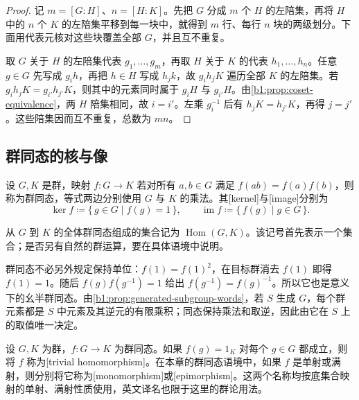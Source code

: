 \begin{proof}
	记 \(m=[G:H]\)、\(n=[H:K]\)。先把 \(G\) 分成 \(m\) 个 \(H\) 的左陪集，再将 \(H\) 中的 \(n\) 个 \(K\) 的左陪集平移到每一块中，就得到 \(m\) 行、每行 \(n\) 块的两级划分。下面用代表元核对这些块覆盖全部 \(G\)，并且互不重复。

	取 \(G\) 关于 \(H\) 的左陪集代表 \(g_1,\ldots,g_m\)，再取 \(H\) 关于 \(K\) 的代表 \(h_1,\ldots,h_n\)。任意 \(g\in G\) 先写成 \(g_i h\)，再把 \(h\in H\) 写成 \(h_jk\)，故 \(g_ih_jK\) 遍历全部 \(K\) 的左陪集。若 \(g_ih_jK=g_{i'}h_{j'}K\)，则其中的元素同时属于 \(g_iH\) 与 \(g_{i'}H\)。由\cref{b1:prop:coset-equivalence}，两 \(H\) 陪集相同，故 \(i=i'\)。左乘 \(g_i^{-1}\) 后有 \(h_jK=h_{j'}K\)，再得 \(j=j'\)。这些陪集因而互不重复，总数为 \(mn\)。
\end{proof}

\subsection{群同态的核与像}
\label{b1:subsec:0202:03}

\begin{definition}\label{b1:def:group-homomorphism}
	设 \(G,K\) 是群，映射 \(f:G\rightarrow K\) 若对所有 \(a,b\in G\) 满足 \(f(ab)=f(a)f(b)\)，则称为群同态，等式两边分别使用 \(G\) 与 \(K\) 的乘法。其[kernel]与[image]分别为
	\[
		\ker f\coloneqq\bigl\{\,g\in G\mid f(g)=1\,\bigr\},\qquad \operatorname{im}f\coloneqq\bigl\{\,f(g)\mid g\in G\,\bigr\}.
	\]
\end{definition}


从 \(G\) 到 \(K\) 的全体群同态组成的集合记为 \(\operatorname{Hom}(G,K)\)。该记号首先表示一个集合；是否另有自然的群运算，要在具体语境中说明。

\ProseParagraphBreak
群同态不必另外规定保持单位：\(f(1)=f(1)^2\)，在目标群消去 \(f(1)\) 即得 \(f(1)=1\)。随后 \(f(g)f(g^{-1})=1\) 给出 \(f(g^{-1})=f(g)^{-1}\)。所以它也是意义下的幺半群同态。由\cref{b1:prop:generated-subgroup-words}，若 \(S\) 生成 \(G\)，每个群元素都是 \(S\) 中元素及其逆元的有限乘积；同态保持乘法和取逆，因此由它在 \(S\) 上的取值唯一决定。

\ProseParagraphBreak
设 \(G,K\) 为群，\(f:G\rightarrow K\) 为群同态。如果 \(f(g)=1_K\) 对每个 \(g\in G\) 都成立，则将 \(f\) 称为[trivial homomorphism]。在本章的群同态语境中，如果 \(f\) 是单射或满射，则分别将它称为[monomorphism]或[epimorphism]。这两个名称均按底集合映射的单射、满射性质使用，英文译名也限于这里的群论用法。

